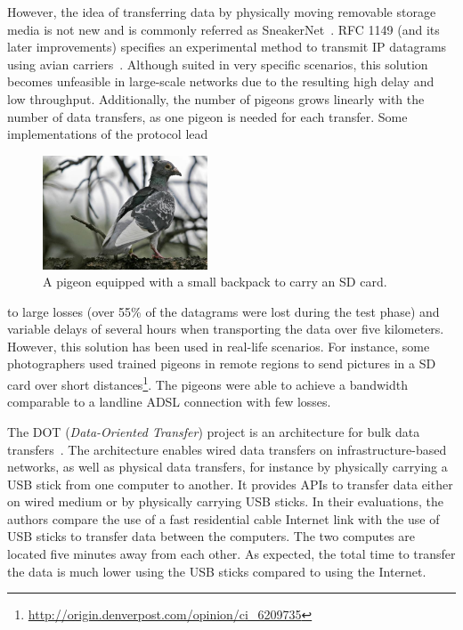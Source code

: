 However, the idea of transferring data by physically moving removable storage media is not new and is commonly referred as SneakerNet~\cite{patterson2003conversation}. RFC 1149 (and its later improvements) specifies an experimental method to transmit IP datagrams using avian carriers~\cite{rfc1149}. Although suited in very specific scenarios, this solution becomes unfeasible in large-scale networks due to the resulting high delay and low throughput. Additionally, the number of pigeons grows linearly with the number of data transfers, as one pigeon is needed for each transfer. Some implementations of the protocol lead
\begin{figure}
    \includegraphics[width=4.9cm]{figures/pigeon.jpg}
    \caption{A pigeon equipped with a small backpack to carry an SD card.}
    \label{fig:pigeon}
\end{figure}
to large losses (over 55\% of the datagrams were lost during the test phase) and variable delays of several hours when transporting the data over five kilometers. However, this solution has been used in real-life scenarios. For instance, some photographers used trained pigeons in remote regions to send pictures in a SD card over short distances\footnote{\url{http://origin.denverpost.com/opinion/ci_6209735}}. The pigeons were able to achieve a bandwidth comparable to a landline ADSL connection with few losses. 

The DOT (\textit{Data-Oriented Transfer}) project is an architecture for bulk data transfers~\cite{tolia2006architecture}. The architecture enables wired data transfers on infrastructure-based networks, as well as physical data transfers, for instance by physically carrying a USB stick from one computer to another. It provides APIs to transfer data either on wired medium or by physically carrying USB sticks. In their evaluations, the authors compare the use of a fast residential cable Internet link with the use of USB sticks to transfer data between the computers. The two computes are located five minutes away from each other. As expected, the total time to transfer the data is much lower using the USB sticks compared to using the Internet. 

